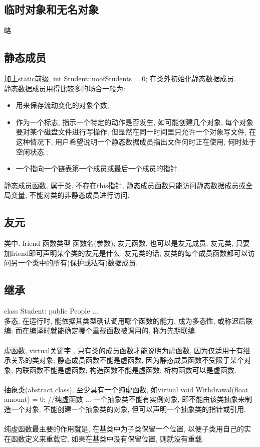 \documentclass[a4paper,10pt,english]{article}
\begin{document}
\subsection{临时对象和无名对象}
略

\subsection{静态成员}
加上static前缀, int Student::noofStudents = 0; 在类外初始化静态数据成员.\\
静态数据成员用得比较多的场合一般为: \\
\begin{itemize}
\item 用来保存流动变化的对象个数;
\item 作为一个标志, 指示一个特定的动作是否发生, 如可能创建几个对象, 每个对象要对某个磁盘文件进行写操作, 但显然在同一时间里只允许一个对象写文件, 在这种情况下, 用户希望说明一个静态数据成员指出文件何时正在使用, 何时处于空闲状态.;
\item 一个指向一个链表第一个成员或最后一个成员的指针.
\end{itemize}

静态成员函数, 属于类, 不存在this指针, 静态成员函数只能访问静态数据成员或全局变量, 不能对类的非静态成员进行访问.

\subsection{友元}
类中, friend 函数类型 函数名(参数); 友元函数, 也可以是友元成员, 友元类, 只要加friend即可声明某个类的友元是什么. 友元类的话, 友类的每个成员函数都可以访问另一个类中的所有(保护或私有)数据成员.

\subsection{继承}
class Student: public People {...}\\
多态, 在运行时, 能依据其类型确认调用哪个函数的能力, 成为多态性, 或称迟后联编; 而在编译时就能确定哪个重载函数被调用的, 称为先期联编. \\\\
虚函数, virtual关键字 , 只有类的成员函数才能说明为虚函数, 因为仅适用于有继承关系的类对象; 静态成员函数不能是虚函数, 因为静态成员函数不受限于某个对象; 内联函数不能是虚函数; 构造函数不能是虚函数; 析构函数可以是虚函数.\\\\
抽象类(abstract class), 至少具有一个纯虚函数, 如virtual void Withdrawal(float amount) = 0; //纯虚函数 ... 一个抽象类不能有实例对象, 即不能由该类抽象来制造一个对象. 不能创建一个抽象类的对象, 但可以声明一个抽象类的指针或引用. \\\\
纯虚函数最主要的作用就是, 在基类中为子类保留一个位置, 以便子类用自己的实在函数定义来重载它, 如果在基类中没有保留位置, 则就没有重载.
\end{document}
